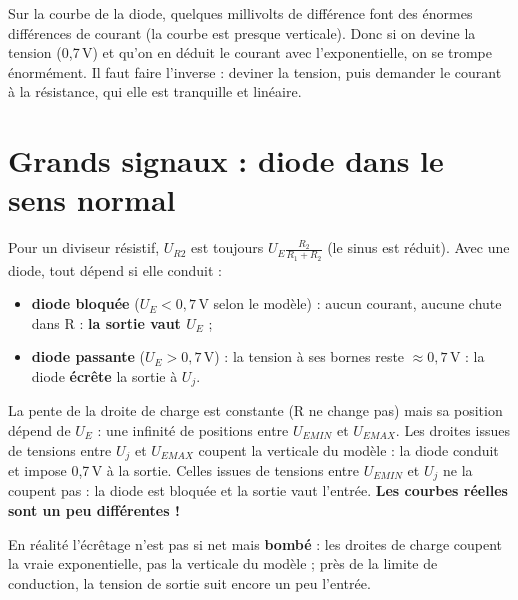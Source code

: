 \begin{goatbox}
Sur la courbe de la diode, quelques millivolts de différence font des énormes différences
de courant (la courbe est presque verticale). Donc si on \og devine\fg{} la tension (0,7\,V)
et qu'on en déduit le courant avec l'exponentielle, on se trompe énormément. Il faut faire
l'inverse : deviner la tension, puis demander le courant à la résistance, qui elle est
tranquille et linéaire.
\end{goatbox}

\section{Grands signaux : diode dans le sens normal}


\begin{thmbox}[title=L'écrêtage à $U_j$]
Pour un diviseur résistif, $U_{R2}$ est toujours $U_E\frac{R_2}{R_1+R_2}$ (le sinus est
réduit). Avec une diode, tout dépend si elle conduit :
\begin{itemize}
  \item \textbf{diode bloquée} ($U_E < 0{,}7$\,V selon le modèle) : aucun courant, aucune
        chute dans R : \textbf{la sortie vaut $U_E$} ;
  \item \textbf{diode passante} ($U_E > 0{,}7$\,V) : la tension à ses bornes reste
        $\approx0{,}7$\,V : la diode \textbf{écrête} la sortie à $U_j$.
\end{itemize}
\end{thmbox}


La pente de la droite de charge est constante (R ne change pas) mais sa position dépend de
$U_E$ : une infinité de positions entre $U_{EMIN}$ et $U_{EMAX}$. Les droites issues de
tensions entre $U_j$ et $U_{EMAX}$ coupent la verticale du modèle : la diode conduit et impose
0,7\,V à la sortie. Celles issues de tensions entre $U_{EMIN}$ et $U_j$ ne la coupent pas :
la diode est bloquée et la sortie vaut l'entrée. \textbf{Les courbes réelles sont un peu
différentes !}


En réalité l'écrêtage n'est pas si net mais \textbf{bombé} : les droites de charge coupent
la vraie exponentielle, pas la verticale du modèle ; près de la limite de conduction, la
tension de sortie suit encore un peu l'entrée.

